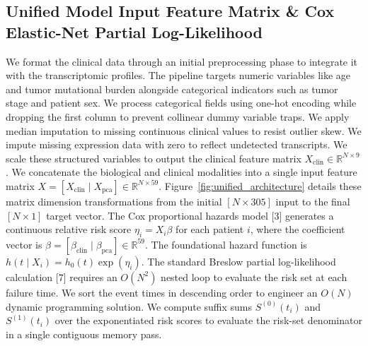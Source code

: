 \subsection{Unified Model Input Feature Matrix \& Cox Elastic-Net Partial Log-Likelihood}
We format the clinical data through an initial preprocessing phase to integrate it with the transcriptomic profiles. The pipeline targets numeric variables like age and tumor mutational burden alongside categorical indicators such as tumor stage and patient sex. We process categorical fields using one-hot encoding while dropping the first column to prevent collinear dummy variable traps. We apply median imputation to missing continuous clinical values to resist outlier skew. We impute missing expression data with zero to reflect undetected transcripts. We scale these structured variables to output the clinical feature matrix $X_{\text{clin}} \in \mathbb{R}^{N \times 9}$. We concatenate the biological and clinical modalities into a single input feature matrix $X = [X_{\text{clin}} \mid X_{\text{pca}}] \in \mathbb{R}^{N \times 59}$. Figure~\ref{fig:unified_architecture} details these matrix dimension transformations from the initial $[N \times 305]$ input to the final $[N \times 1]$ target vector. The Cox proportional hazards model [3] generates a continuous relative risk score $\eta_i = X_i \beta$ for each patient $i$, where the coefficient vector is $\beta = [\beta_{\text{clin}} \mid \beta_{\text{pca}}] \in \mathbb{R}^{59}$. The foundational hazard function is $h(t \mid X_i) = h_0(t) \exp(\eta_i)$. The standard Breslow partial log-likelihood calculation [7] requires an $O(N^2)$ nested loop to evaluate the risk set at each failure time. We sort the event times in descending order to engineer an $O(N)$ dynamic programming solution. We compute suffix sums $S^{(0)}(t_i)$ and $S^{(1)}(t_i)$ over the exponentiated risk scores to evaluate the risk-set denominator in a single contiguous memory pass.

